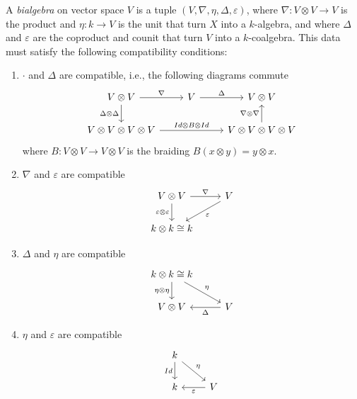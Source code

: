 \documentclass[TFM.tex]{subfiles}
\begin{document}
\begin{defi}
A \emph{bialgebra} on vector space $V$ is a tuple $(V,\nabla,\eta, \Delta,\varepsilon)$, where $\nabla:V\otimes V\to V$ is the product and $\eta:k\to V$ is the unit that turn $X$ into a $k$-algebra, and where $\Delta$ and $\varepsilon$ are the coproduct and counit that turn $V$ into a $k$-coalgebra. This data must satisfy the following compatibility conditions:
\begin{enumerate}
\item $\cdot$ and $\Delta$ are compatible, i.e., the following diagrams commute
\[
\begin{tikzcd}
V\otimes V \arrow[r, "\nabla"] \arrow[d, "\Delta\otimes\Delta"'] & V \arrow[r, "\Delta"] & V\otimes V                                                    \\
V\otimes V\otimes V\otimes V \arrow[rr, "Id\otimes B\otimes Id"] &                       & V\otimes V\otimes V\otimes V \arrow[u, "\nabla\otimes\nabla"]
\end{tikzcd}
\]
where $B:V\otimes V\to V\otimes V$ is the braiding $B(x\otimes y)=y\otimes x$. 

\item $\nabla$ and $\varepsilon$ are compatible
\[
\begin{tikzcd}
V\otimes V \arrow[r, "\nabla"] \arrow[d, "\varepsilon\otimes\varepsilon"'] & V \arrow[ld, "\varepsilon"] \\
k\otimes k\cong k                                                          &                            
\end{tikzcd}
\]
\item $\Delta$ and $\eta$ are compatible
\[
\begin{tikzcd}
k\otimes k\cong k \arrow[d, "\eta\otimes\eta"'] \arrow[rd, "\eta"] &                       \\
V\otimes V                                                         & V \arrow[l, "\Delta"]
\end{tikzcd}
\]
\item $\eta$ and $\varepsilon$ are compatible
\[
\begin{tikzcd}
k \arrow[rd, "\eta"] \arrow[d, "Id"'] &                            \\
k                                     & V \arrow[l, "\varepsilon"]
\end{tikzcd}
\]
\end{enumerate}

\end{defi}
\end{document}
